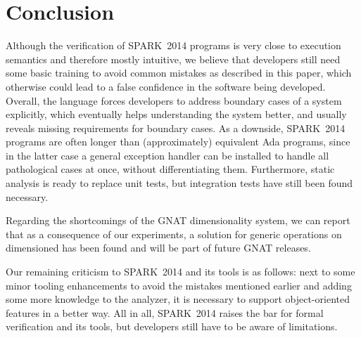 \section{Conclusion\label{sec:conclusion}}
Although the verification of SPARK~2014 programs is very close to
execution semantics and therefore mostly intuitive, we believe that
developers still need some basic training to avoid common mistakes as
described in this paper, which otherwise could lead to a false confidence in
the software being developed. 
Overall, the language forces developers to address boundary
cases %
of a system explicitly, which eventually helps understanding the
system better, and usually reveals missing requirements for
boundary cases. As a downside, SPARK~2014 programs are often longer than
(approximately) equivalent Ada programs, since in the latter case a
general exception handler can be installed to handle all pathological
cases at once, without differentiating them. Furthermore, static analysis is ready
to replace unit tests, but integration tests have still been found
necessary. 

Regarding the shortcomings of the GNAT dimensionality system, we
can report that as a consequence of our experiments, a solution for
generic operations on dimensioned has been found and will be part of future GNAT releases.

Our remaining criticism to SPARK~2014 and its tools is as follows:
next to some minor tooling enhancements to avoid the mistakes
mentioned earlier and adding some more knowledge to the analyzer, it
is necessary to support object-oriented features in a better
way. All in all, SPARK~2014 raises the bar for formal
verification and its tools, but developers still have to be aware of
limitations.


